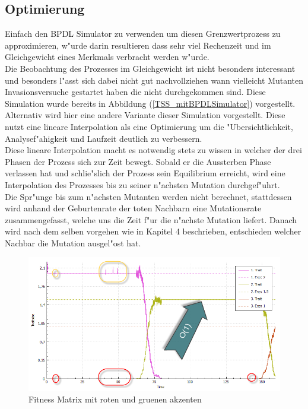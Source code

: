 \documentclass[11pt, a4paper, german]{article}
\theoremstyle{plain}
\begin{document}
	\subsection{Optimierung}
	Einfach den BPDL Simulator zu verwenden um diesen Grenzwertprozess zu approximieren, w"urde darin resultieren dass sehr viel Rechenzeit und im Gleichgewicht eines Merkmals verbracht werden w"urde.\\
	Die Beobachtung des Prozesses im Gleichgewicht ist nicht besonders interessant und besonders l"asst sich dabei nicht gut nachvollziehen wann vielleicht Mutanten Invasionsversuche gestartet haben die nicht durchgekommen sind. Diese Simulation wurde bereits in Abbildung (\ref{TSS_mitBPDLSimulator}) vorgestellt.\\
	Alternativ wird hier eine andere Variante dieser Simulation vorgestellt. 
	Diese nutzt eine lineare Interpolation als eine Optimierung um die "Ubersichtlichkeit, Analysef"ahigkeit und Laufzeit deutlich zu verbessern.\\
	Diese lineare Interpolation macht es notwendig stets zu wissen in welcher der drei Phasen der Prozess sich zur Zeit bewegt. Sobald er die Aussterben Phase verlassen hat und schlie"slich der Prozess sein Equilibrium erreicht, wird eine Interpolation des Prozesses bis zu seiner n"achsten Mutation durchgef"uhrt.\\
	Die Spr"unge bis zum n"achsten Mutanten werden nicht berechnet, stattdessen wird anhand der Geburtenrate der toten Nachbarn eine Mutationsrate zusammengefasst, welche uns die Zeit f"ur die n"achste Mutation liefert. Danach wird nach dem selben vorgehen wie in Kapitel 4 beschrieben, entschieden welcher Nachbar die Mutation ausgel"ost hat.\\
	\begin{figure}[H]
		\centering
		\includegraphics[width=1\linewidth]{./Pictures/TSS2_optimierung_small}
		\caption[MainWindow_redGreenFitness]{Fitness Matrix mit roten und gruenen akzenten}
		\label{TSS2_optimierung_small}
	\end{figure}
\end{document}
